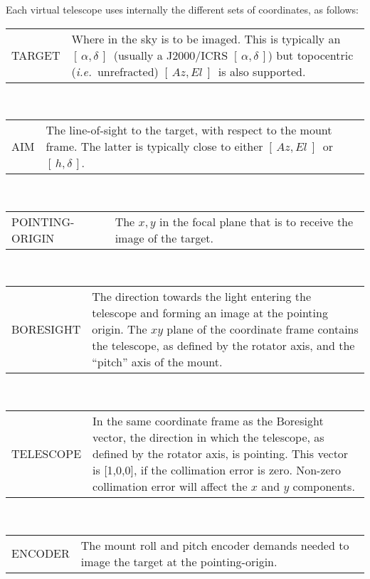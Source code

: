 \documentclass[12pt,fleqn,twoside]{article}
\renewcommand{\_}{{\tt\char'137}}     %
\newcommand{\radec}     {$[\,\alpha,\delta\,]$}
\newcommand{\hadec}     {$[\,h,\delta\,]$}
\newcommand{\azel}      {$[\,Az,El~]$}
\begin{document}
Each virtual telescope uses internally the different sets
of coordinates, as follows:

\begin{center}
\begin{tabular}{p{22ex}p{54ex}}
{\sc TARGET}     & Where in the sky is to be imaged.  This is
                   typically an \radec\ (usually a J2000/ICRS \radec)
                   but topocentric ({\it i.e.}~unrefracted)
                   \azel\ is also supported. \\
\end{tabular}
\\[\bigskipamount]
\begin{tabular}{p{22ex}p{54ex}}
AIM              & The line-of-sight to the target, with respect to
                   the mount frame.  The latter is typically close
                   to either \azel\ or \hadec. \\
\end{tabular}
\\[\bigskipamount]
\begin{tabular}{p{22ex}p{54ex}}
POINTING-ORIGIN  & The $x,y$ in the focal plane that is to
                   receive the image of the target. \\
\end{tabular}
\\[\bigskipamount]
\begin{tabular}{p{22ex}p{54ex}}
BORESIGHT        & The direction towards the light entering the
                   telescope and forming an image at the pointing
                   origin.  The $xy$ plane of the coordinate frame
                   contains the telescope, as defined by the rotator
                   axis, and the ``pitch'' axis of the mount. \\
\end{tabular}
\\[\bigskipamount]
\begin{tabular}{p{22ex}p{54ex}}
TELESCOPE        & In the same coordinate frame as the {\sc Boresight}
                   vector, the direction in which the telescope,
                   as defined by the rotator axis, is pointing.
                   This vector is [1,0,0], if the collimation error
                   is zero.  Non-zero collimation error will affect
                   the $x$ and $y$ components. \\
\end{tabular}
\\[\bigskipamount]
\begin{tabular}{p{22ex}p{54ex}}
ENCODER          & The mount roll and pitch encoder demands
                   needed to image the
                   target at the pointing-origin. \\
\end{tabular}
\end{center}
\end{document}
